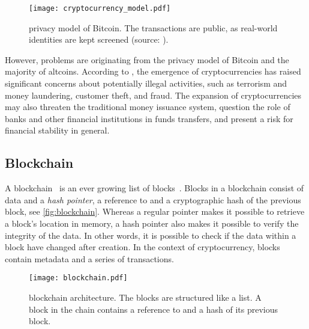 \begin{figure}[ht]
    \texttt{[image: cryptocurrency\_model.pdf]}
    \caption[Bitcoin's privacy model]{privacy model of Bitcoin. The transactions are public, as real-world identities are kept screened (source: \cite{bitcoin}).}
    \label{fig:cryptocurrency_model}
\end{figure}

However, problems are originating from the privacy model of Bitcoin and the majority of altcoins. According to \cite{bitcoin_regulation}, the emergence of cryptocurrencies has raised significant concerns about potentially illegal activities, such as terrorism and money laundering, customer theft, and fraud. The expansion of cryptocurrencies may also threaten the traditional money issuance system, question the role of banks and other financial institutions in funds transfers, and present a risk for financial stability in general.

\subsection{Blockchain}\label{sec:blockchain}
A blockchain~\cite{bitcoin_book} is an ever growing list of blocks~\cite{bitcoin_book}. Blocks in a blockchain consist of data and a \emph{hash pointer}, a reference to and a cryptographic hash of the previous block, see \autoref{fig:blockchain}. Whereas a regular pointer makes it possible to retrieve a block's location in memory, a hash pointer also makes it possible to verify the integrity of the data. In other words, it is possible to check if the data within a block have changed after creation. In the context of cryptocurrency, blocks contain metadata and a series of transactions.

\begin{figure}[ht]
    \texttt{[image: blockchain.pdf]}
    \caption[Architecture - Blockchain]{blockchain architecture. The blocks are structured like a list. A block in the chain contains a reference to and a hash of its previous block.}
    \label{fig:blockchain}
\end{figure}

